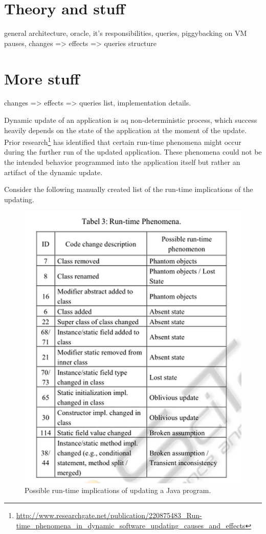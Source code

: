 \section{Theory and stuff}

general architecture, oracle, it’s responsibilities, queries, piggybacking on VM
pauses, changes => effects => queries structure


\section{More stuff}
changes => effects => queries list, implementation details. 

Dynamic update of an application is aq non-deterministic process, which success
heavily depends on the state of the application at the moment of the update.
Prior
research\footnote{\url{http://www.researchgate.net/publication/220875483_Run-time_phenomena_in_dynamic_software_updating_causes_and_effects}}
has identified that certain run-time phenomena might occur during the further
run of the updated application. These phenomena could not be the intended
behavior programmed into the application itself but rather an artifact of the
dynamic update.

Consider the following manually created list of the run-time implications of the updating. 

\begin{figure}[ht!]
\begin{center}
\leavevmode
\includegraphics[scale=0.6]{../images/fig1.png}
\end{center}
\caption{Possible run-time implications of updating a Java program.
\label{possible_changes}}
\end{figure}

